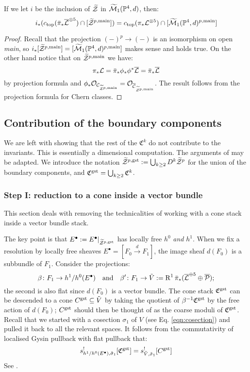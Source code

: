 \begin{lem}\label{lem:main-compo}
 If we let $i$ be the inclusion of $\widetilde{\mathcal Z}$ in $\widetilde{\mathcal{M}}_1(\mathbb P^4,d)$, then:
 \[
  i_*(c_{\rm{top}}(\bar{\pi}_*\overline{\mathcal{L}}^{\otimes 5})\cap[\widetilde{\mathcal Z}^{p,\rm{main}}])=c_{\rm{top}}({\pi}_*\mathcal L^{\otimes 5})\cap[\widetilde{\mathcal{M}}_1(\mathbb P^4,d)^{p,\rm{main}}]
 \]
\end{lem}
\begin{proof}
 Recall that the projection $(-)^p\to (-)$ is an isomorphism on open \emph{main}, so $i_*[\widetilde{\mathcal Z}^{p,\rm{main}}]=[\widetilde{\mathcal{M}}_1(\mathbb P^4,d)^{p,\rm{main}}]$ makes sense and holds true. On the other hand notice that on $\widetilde{\mathcal Z}^{p,\rm{main}}$ we have:
 \[
  \pi_*\mathcal L=\bar{\pi}_*\phi_*\phi^*\overline{\mathcal{L}}=\bar{\pi}_*\overline{\mathcal{L}}
 \]
by projection formula and $\phi_*\mathcal{O}_{\mathcal{C}_{\widetilde{\mathcal Z}^{p,\rm{main}}}}=\mathcal{O}_{\overline{\mathcal{C}}_{\widetilde{\mathcal Z}^{p,\rm{main}}}}$. The result follows from the projection formula for Chern classes.
\end{proof}

\subsection{Contribution of the boundary components} We are left with showing that the rest of the $\mathfrak C^k$ do not contribute to the invariants. This is essentially a dimensional computation. The arguments of \cite[\S\S6-8]{CL-pfields} may be adapted. We introduce the notation $\widetilde{\mathcal Z}^{p,\rm{gst}}:=\bigcup_{k\geq 2} D^k\widetilde{\mathcal Z}^p$ for the union of the boundary components, and $\mathfrak C^{\rm{gst}}=\bigcup_{k\geq 2}\mathfrak C^k$.

\subsubsection{Step I: reduction to a cone inside a vector bundle}

This section deals with removing the technicalities of working with a cone stack inside a vector bundle stack.

The key point is that $E^{\bullet}:=E^{\bullet}\rvert_{\widetilde{\mathcal Z}^{p,\rm{gst}}}$ has locally free $h^0$ \emph{and} $h^1$. When we fix a resolution by locally free sheaves $E^{\bullet}=[F_0\xrightarrow{d} F_1]$, the image sheaf $d(F_0)$ is a subbundle of $F_1$. Consider the projections:
\[
 \beta\colon F_1\rightarrow h^1/h^0(E^{\bullet}) \quad \text{and} \quad \beta'\colon F_1\rightarrow \tilde{V}:=\operatorname{R}^1\bar{\pi}_*(\overline{\mathcal{L}}^{\oplus 5}\oplus\overline{\mathcal P});
\]
the second is also flat since $d(F_0)$ is a vector bundle. The cone stack $\mathfrak C^{\rm{gst}}$ can be descended to a cone $C^{\rm{gst}}\subseteq \tilde{V}$ by taking the quotient of $\beta^{-1}\mathfrak C^{\rm{gst}}$ by the free action of $d(F_0)$; $C^{\rm{gst}}$ should then be thought of as the coarse moduli of $\mathfrak C^{\rm{gst}}$. Recall that we started with a cosection $\sigma_1$ of $V$ (see Eq. \eqref{eqn:cosection}) and pulled it back to all the relevant spaces. 
It follows from the commutativity of localised Gysin pullback with flat pullback that:
\[
 s^!_{h^1/h^0(E^{\bullet}),\tilde\sigma_1}[\mathfrak C^{\rm{gst}}]= s^!_{\tilde V,\tilde\sigma_1}[C^{\rm{gst}}]
\]
See \cite[Proposition 6.3]{CL-pfields}.



